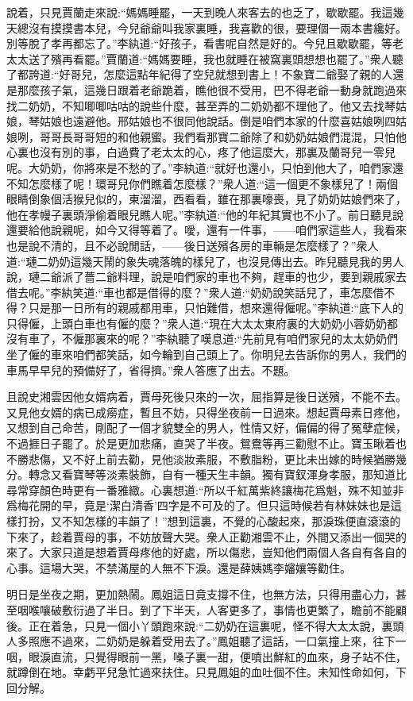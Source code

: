 \begin{parag}
    說着，只見賈蘭走來說:“媽媽睡罷，一天到晚人來客去的也乏了，歇歇罷。我這幾天總沒有摸摸書本兒，今兒爺爺叫我家裏睡，我喜歡的很，要理個一兩本書纔好。別等脫了孝再都忘了。”李紈道:“好孩子，看書呢自然是好的。今兒且歇歇罷，等老太太送了殯再看罷。”賈蘭道:“媽媽要睡，我也就睡在被窩裏頭想想也罷了。”衆人聽了都誇道:“好哥兒，怎麼這點年紀得了空兒就想到書上！不象寶二爺娶了親的人還是那麼孩子氣，這幾日跟着老爺跪着，瞧他很不受用，巴不得老爺一動身就跑過來找二奶奶，不知唧唧咕咕的說些什麼，甚至弄的二奶奶都不理他了。他又去找琴姑娘，琴姑娘也遠避他。邢姑娘也不很同他說話。倒是咱們本家的什麼喜姑娘咧四姑娘咧，哥哥長哥哥短的和他親蜜。我們看那寶二爺除了和奶奶姑娘們混混，只怕他心裏也沒有別的事，白過費了老太太的心，疼了他這麼大，那裏及蘭哥兒一零兒呢。大奶奶，你將來是不愁的了。”李紈道:“就好也還小，只怕到他大了，咱們家還不知怎麼樣了呢！環哥兒你們瞧着怎麼樣？”衆人道:“這一個更不象樣兒了！兩個眼睛倒象個活猴兒似的，東溜溜，西看看，雖在那裏嚎喪，見了奶奶姑娘們來了，他在孝幔子裏頭淨偷着眼兒瞧人呢。”李紈道:“他的年紀其實也不小了。前日聽見說還要給他說親呢，如今又得等着了。噯，還有一件事，——咱們家這些人，我看來也是說不清的，且不必說閒話，——後日送殯各房的車輛是怎麼樣了？”衆人道:“璉二奶奶這幾天鬧的象失魂落魄的樣兒了，也沒見傳出去。昨兒聽見我的男人說，璉二爺派了薔二爺料理，說是咱們家的車也不夠，趕車的也少，要到親戚家去借去呢。”李紈笑道:“車也都是借得的麼？”衆人道:“奶奶說笑話兒了，車怎麼借不得？只是那一日所有的親戚都用車，只怕難借，想來還得僱呢。”李紈道:“底下人的只得僱，上頭白車也有僱的麼？”衆人道:“現在大太太東府裏的大奶奶小蓉奶奶都沒有車了，不僱那裏來的呢？”李紈聽了嘆息道:“先前見有咱們家兒的太太奶奶們坐了僱的車來咱們都笑話，如今輪到自己頭上了。你明兒去告訴你的男人，我們的車馬早早兒的預備好了，省得擠。”衆人答應了出去。不題。
\end{parag}


\begin{parag}
    且說史湘雲因他女婿病着，賈母死後只來的一次，屈指算是後日送殯，不能不去。又見他女婿的病已成癆症，暫且不妨，只得坐夜前一日過來。想起賈母素日疼他，又想到自己命苦，剛配了一個才貌雙全的男人，性情又好，偏偏的得了冤孽症候，不過捱日子罷了。於是更加悲痛，直哭了半夜。鴛鴦等再三勸慰不止。寶玉瞅着也不勝悲傷，又不好上前去勸，見他淡妝素服，不敷脂粉，更比未出嫁的時候猶勝幾分。轉念又看寶琴等淡素裝飾，自有一種天生丰韻。獨有寶釵渾身孝服，那知道比尋常穿顏色時更有一番雅緻。心裏想道:“所以千紅萬紫終讓梅花爲魁，殊不知並非爲梅花開的早，竟是‘潔白清香’四字是不可及的了。但只這時候若有林妹妹也是這樣打扮，又不知怎樣的丰韻了！”想到這裏，不覺的心酸起來，那淚珠便直滾滾的下來了，趁着賈母的事，不妨放聲大哭。衆人正勸湘雲不止，外間又添出一個哭的來了。大家只道是想着賈母疼他的好處，所以傷悲，豈知他們兩個人各自有各自的心事。這場大哭，不禁滿屋的人無不下淚。還是薛姨媽李嬸孃等勸住。
\end{parag}


\begin{parag}
    明日是坐夜之期，更加熱鬧。鳳姐這日竟支撐不住，也無方法，只得用盡心力，甚至咽喉嚷破敷衍過了半日。到了下半天，人客更多了，事情也更繁了，瞻前不能顧後。正在着急，只見一個小丫頭跑來說:“二奶奶在這裏呢，怪不得大太太說，裏頭人多照應不過來，二奶奶是躲着受用去了。”鳳姐聽了這話，一口氣撞上來，往下一咽，眼淚直流，只覺得眼前一黑，嗓子裏一甜，便噴出鮮紅的血來，身子站不住，就蹲倒在地。幸虧平兒急忙過來扶住。只見鳳姐的血吐個不住。未知性命如何，下回分解。
\end{parag}